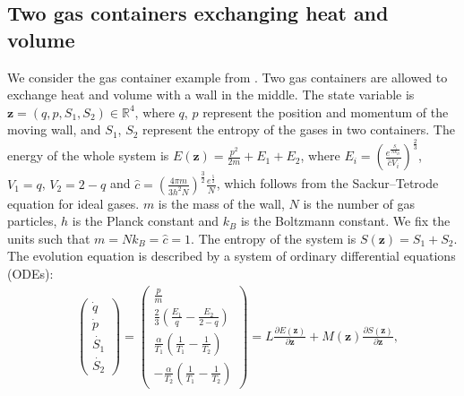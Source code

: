 \documentclass[openacc]{rsproca_new}%
\newcommand{\z}{\bm{z}}
\begin{document}
\subsection{Two gas containers exchanging heat and volume}
We consider the gas container example from 
\cite{shang2020structure}. 
Two gas containers are allowed to exchange heat and volume with a wall in the middle. The state variable
is $\z = (q,p,S_1,S_2) \in \mathbb{R}^4$, 
where $q$, $p$ represent the position and momentum of the moving wall, and 
$S_1$, $S_2$ represent the entropy of the gases in two containers. 
The energy of the whole system is  $E(\z) = \frac{p^2}{2m} + E_1 + E_2$,
where $E_i = (\frac{e^\frac{S_i}{Nk_B}}{\hat{c}V_i})^{\frac{2}{3}}$,
$V_1 = q$, $V_2 = 2-q$ and $\hat{c}= \left(\frac{4\pi m}{3h^2N}\right)^{\frac{3}{2}}\frac{e^{\frac{5}{2}}}{N}$,
which follows from the Sackur–Tetrode equation \cite{schroeder1999introduction} for ideal gases. 
$m$ is the mass of the wall, $N$ is the number of gas particles, $h$ is the Planck constant and $k_B$ is the Boltzmann constant. We fix the units such that $m = Nk_B = \hat{c} = 1$. The entropy of the system is $S(\z) = S_1 + S_2$.
The evolution equation is described by a system of  ordinary differential equations (ODEs):
\begin{equation} \label{def:LM-gc}
\begin{split}
    &\begin{pmatrix} \dot{q} \\ \dot{p} \\ \dot{S_1} \\ \dot{S_2} \end{pmatrix}=\begin{pmatrix} \frac{p}{m} \\ \frac{2}{3}(\frac{E_1}{q} - \frac{E_2}{2 - q}) \\
    \frac{\alpha}{T_1}(\frac{1}{T_1}-\frac{1}{T_2}) \\
    -\frac{\alpha}{T_2}(\frac{1}{T_1}-\frac{1}{T_2})\end{pmatrix}=L\frac{\partial E(\z)}{\partial \z} + M(\z)\frac{\partial S(\z)}{\partial \z},
\end{split}
\end{equation}
\end{document}
